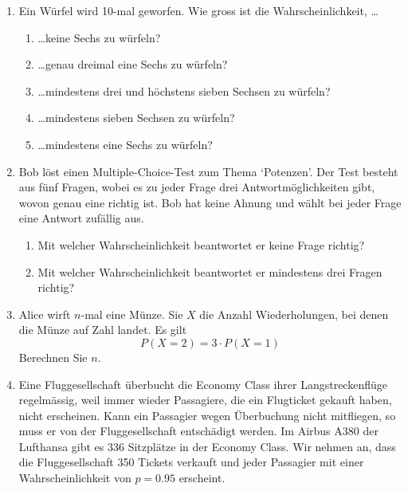 \clearpage
\begin{ueb}
    {}{}
    \begin{enumerate}
        \item Ein Würfel wird 10-mal geworfen. Wie gross ist die Wahrscheinlichkeit, \dots
              \begin{enumerate}
                  \item \dots keine Sechs zu würfeln?
                  \item \dots genau dreimal eine Sechs zu würfeln?
                  \item \dots mindestens drei und höchstens sieben Sechsen zu würfeln?
                  \item \dots mindestens sieben Sechsen zu würfeln?
                  \item \dots mindestens eine Sechs zu würfeln?
              \end{enumerate}
        \item Bob löst einen Multiple-Choice-Test zum Thema `Potenzen'. Der Test besteht aus fünf Fragen, wobei es zu jeder Frage drei Antwortmöglichkeiten gibt, wovon genau eine richtig ist. Bob hat keine Ahnung und wählt bei jeder Frage eine Antwort zufällig aus.
              \begin{enumerate}
                  \item Mit welcher Wahrscheinlichkeit beantwortet er keine Frage richtig?
                  \item Mit welcher Wahrscheinlichkeit beantwortet er mindestens drei Fragen richtig?
              \end{enumerate}

        \item Alice wirft \(n\)-mal eine Münze. Sie \(X\) die Anzahl Wiederholungen, bei denen die Münze auf Zahl landet. Es gilt
              \[P(X=2) = 3\cdot P(X=1)\]
              Berechnen Sie  \(n\).
        \item Eine Fluggesellschaft überbucht die Economy Class ihrer Langstreckenflüge regelmässig, weil immer wieder Passagiere, die ein Flugticket gekauft haben, nicht erscheinen.
              Kann ein Passagier wegen Überbuchung nicht mitfliegen, so muss er von der Fluggesellschaft entschädigt werden.
              Im Airbus A380 der Lufthansa gibt es 336 Sitzplätze in der Economy Class.
              Wir nehmen an, dass die Fluggesellschaft 350 Tickets verkauft und jeder Passagier mit einer Wahrscheinlichkeit von \( p = 0.95 \) erscheint.


\end{enumerate}
\end{ueb}
